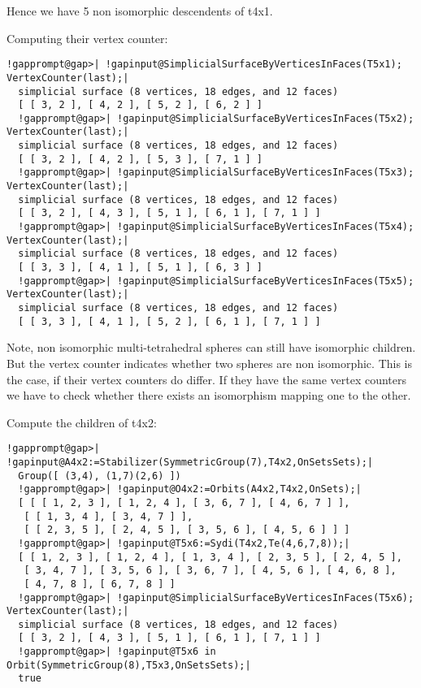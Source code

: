 \documentclass[a4paper,11pt]{report}
\begin{document}
{{{ Hence we have 5 non isomorphic descendents of t4x1. 

 Computing their vertex counter: 

 
\begin{Verbatim}[commandchars=!@|,fontsize=\small,frame=single,label=Example]
  !gapprompt@gap>| !gapinput@SimplicialSurfaceByVerticesInFaces(T5x1); VertexCounter(last);|
  simplicial surface (8 vertices, 18 edges, and 12 faces)
  [ [ 3, 2 ], [ 4, 2 ], [ 5, 2 ], [ 6, 2 ] ]
  !gapprompt@gap>| !gapinput@SimplicialSurfaceByVerticesInFaces(T5x2); VertexCounter(last);|
  simplicial surface (8 vertices, 18 edges, and 12 faces)
  [ [ 3, 2 ], [ 4, 2 ], [ 5, 3 ], [ 7, 1 ] ]
  !gapprompt@gap>| !gapinput@SimplicialSurfaceByVerticesInFaces(T5x3); VertexCounter(last);|
  simplicial surface (8 vertices, 18 edges, and 12 faces)
  [ [ 3, 2 ], [ 4, 3 ], [ 5, 1 ], [ 6, 1 ], [ 7, 1 ] ]
  !gapprompt@gap>| !gapinput@SimplicialSurfaceByVerticesInFaces(T5x4); VertexCounter(last);|
  simplicial surface (8 vertices, 18 edges, and 12 faces)
  [ [ 3, 3 ], [ 4, 1 ], [ 5, 1 ], [ 6, 3 ] ]
  !gapprompt@gap>| !gapinput@SimplicialSurfaceByVerticesInFaces(T5x5); VertexCounter(last);|
  simplicial surface (8 vertices, 18 edges, and 12 faces)
  [ [ 3, 3 ], [ 4, 1 ], [ 5, 2 ], [ 6, 1 ], [ 7, 1 ] ]
\end{Verbatim}
 

 Note, non isomorphic multi-tetrahedral spheres can still have isomorphic
children. But the vertex counter indicates whether two spheres are non
isomorphic. This is the case, if their vertex counters do differ. If they have
the same vertex counters we have to check whether there exists an isomorphism
mapping one to the other. 

 Compute the children of t4x2: 
\begin{Verbatim}[commandchars=!@|,fontsize=\small,frame=single,label=Example]
  !gapprompt@gap>| !gapinput@A4x2:=Stabilizer(SymmetricGroup(7),T4x2,OnSetsSets);|
  Group([ (3,4), (1,7)(2,6) ])
  !gapprompt@gap>| !gapinput@O4x2:=Orbits(A4x2,T4x2,OnSets);|
  [ [ [ 1, 2, 3 ], [ 1, 2, 4 ], [ 3, 6, 7 ], [ 4, 6, 7 ] ], 
   [ [ 1, 3, 4 ], [ 3, 4, 7 ] ], 
   [ [ 2, 3, 5 ], [ 2, 4, 5 ], [ 3, 5, 6 ], [ 4, 5, 6 ] ] ]
  !gapprompt@gap>| !gapinput@T5x6:=Sydi(T4x2,Te(4,6,7,8));|
  [ [ 1, 2, 3 ], [ 1, 2, 4 ], [ 1, 3, 4 ], [ 2, 3, 5 ], [ 2, 4, 5 ], 
   [ 3, 4, 7 ], [ 3, 5, 6 ], [ 3, 6, 7 ], [ 4, 5, 6 ], [ 4, 6, 8 ], 
   [ 4, 7, 8 ], [ 6, 7, 8 ] ]
  !gapprompt@gap>| !gapinput@SimplicialSurfaceByVerticesInFaces(T5x6); VertexCounter(last);|
  simplicial surface (8 vertices, 18 edges, and 12 faces)
  [ [ 3, 2 ], [ 4, 3 ], [ 5, 1 ], [ 6, 1 ], [ 7, 1 ] ]
  !gapprompt@gap>| !gapinput@T5x6 in Orbit(SymmetricGroup(8),T5x3,OnSetsSets);|
  true
\end{Verbatim}
 

}}}
\end{document}
